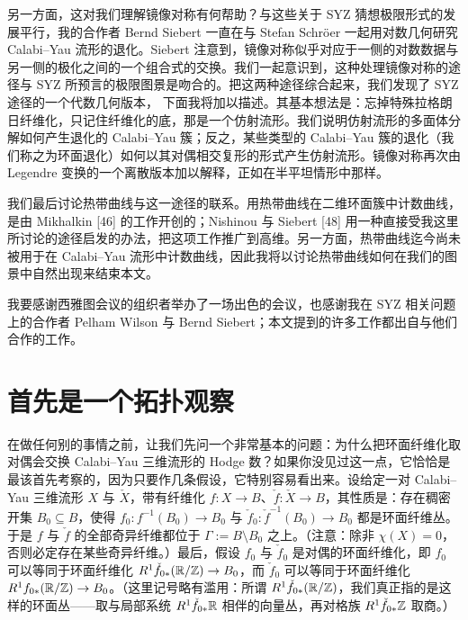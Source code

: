 另一方面，这对我们理解镜像对称有何帮助？与这些关于 SYZ 猜想极限形式的发展平行，我的合作者 Bernd Siebert 一直在与 Stefan Schröer 一起用对数几何研究 Calabi--Yau 流形的退化。Siebert 注意到，镜像对称似乎对应于一侧的对数数据与另一侧的极化之间的一个组合式的交换。我们一起意识到，这种处理镜像对称的途径与 SYZ 所预言的极限图景是吻合的。把这两种途径综合起来，我们发现了 SYZ 途径的一个代数几何版本，
下面我将加以描述。其基本想法是：忘掉特殊拉格朗日纤维化，只记住纤维化的底，那是一个仿射流形。我们说明仿射流形的多面体分解如何产生退化的 Calabi--Yau 簇；反之，某些类型的 Calabi--Yau 簇的退化（我们称之为环面退化）如何以其对偶相交复形的形式产生仿射流形。镜像对称再次由 Legendre 变换的一个离散版本加以解释，正如在半平坦情形中那样。

我们最后讨论热带曲线与这一途径的联系。用热带曲线在二维环面簇中计数曲线，是由 Mikhalkin [46] 的工作开创的；Nishinou 与 Siebert [48] 用一种直接受我这里所讨论的途径启发的办法，把这项工作推广到高维。另一方面，热带曲线迄今尚未被用于在 Calabi--Yau 流形中计数曲线，因此我将以讨论热带曲线如何在我们的图景中自然出现来结束本文。


我要感谢西雅图会议的组织者举办了一场出色的会议，也感谢我在 SYZ 相关问题上的合作者 Pelham Wilson 与 Bernd Siebert；本文提到的许多工作都出自与他们合作的工作。


\section{首先是一个拓扑观察}

在做任何别的事情之前，让我们先问一个非常基本的问题：为什么把环面纤维化取对偶会交换 Calabi--Yau 三维流形的 Hodge 数？如果你没见过这一点，它恰恰是最该首先考察的，因为只要作几条假设，它特别容易看出来。设给定一对 Calabi--Yau 三维流形 $X$ 与 $\check X$，带有纤维化 $f:X\to B$、$\check f:\check X\to B$，其性质是：存在稠密开集 $B_0\subseteq B$，使得 $f_0:f^{-1}(B_0)\to B_0$ 与 $\check f_0:\check f^{-1}(B_0)\to B_0$ 都是环面纤维丛。于是 $f$ 与 $\check f$ 的全部奇异纤维都位于 $\Gamma:=B\setminus B_0$ 之上。（注意：除非 $\chi(X)=0$，否则必定存在某些奇异纤维。）最后，假设 $f_0$ 与 $\check f_0$ 是对偶的环面纤维化，即 $f_0$ 可以等同于环面纤维化 $R^1\check f_{0*}(\mathbb{R}/\mathbb{Z})\to B_0$，而 $\check f_0$ 可以等同于环面纤维化 $R^1f_{0*}(\mathbb{R}/\mathbb{Z})\to B_0$。（这里记号略有滥用：所谓 $R^1\check f_{0*}(\mathbb{R}/\mathbb{Z})$，我们真正指的是这样的环面丛------取与局部系统 $R^1\check f_{0*}\mathbb{R}$ 相伴的向量丛，再对格族 $R^1\check f_{0*}\mathbb{Z}$ 取商。）

